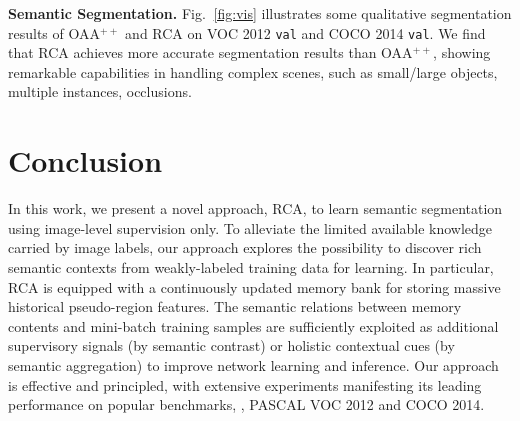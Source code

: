 \documentclass[10pt,twocolumn,letterpaper]{article}
\begin{document}
\noindent\textbf{Semantic Segmentation.} Fig.$_{\!}$~\ref{fig:vis} illustrates some qualitative segmentation results of OAA$^{++}$ and  RCA on  VOC 2012 \texttt{val} and COCO 2014 \texttt{val}. We find that RCA achieves more accurate segmentation results than OAA$^{++}$, showing remarkable capabilities in handling complex scenes, such as  small/large objects, multiple instances, occlusions.



























\section{Conclusion}

In this work, we present a novel approach, RCA, to learn semantic segmentation using image-level supervision only. To alleviate the limited available knowledge carried by image labels, our approach explores the possibility to discover rich semantic contexts from weakly-labeled training data for  learning. In particular, RCA is equipped with a continuously updated memory bank for storing massive historical pseudo-region features. The semantic relations between memory contents and mini-batch training samples are sufficiently exploited as additional supervisory signals (by semantic contrast) or holistic contextual cues (by semantic aggregation) to improve network learning and inference. Our approach is effective and principled, with extensive experiments manifesting its leading performance on popular benchmarks, \ie, PASCAL VOC 2012 and COCO 2014.





{
\small


}
\end{document}
